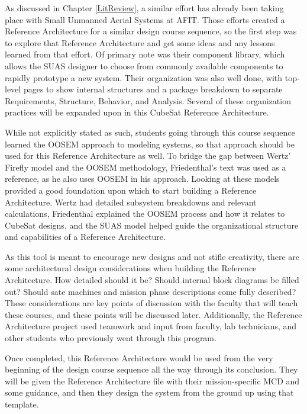 As discussed in Chapter \ref{LitReview}, a similar effort has already been taking place with Small Unmanned Aerial Systems at AFIT. Those efforts created a Reference Architecture for a similar design course sequence, so the first step was to explore that Reference Architecture and get some ideas and any lessons learned from that effort. Of primary note was their component library, which allows the SUAS designer to choose from commonly available components to rapidly prototype a new system. Their organization was also well done, with top-level pages to show internal structures and a package breakdown to separate Requirements, Structure, Behavior, and Analysis. Several of these organization practices will be expanded upon in this CubeSat Reference Architecture.

While not explicitly stated as such, students going through this course sequence learned the OOSEM approach to modeling systems, so that approach should be used for this Reference Architecture as well. To bridge the gap between Wertz' Firefly model \citep{Wertz2011SpaceSMAD} and the OOSEM methodology, Friedenthal's text \citep{FriedenthalArchitectingSpacecraft} was used as a reference, as he also uses OOSEM in his approach. Looking at these models provided a good foundation upon which to start building a Reference Architecture. Wertz had detailed subsystem breakdowns and relevant calculations, Friedenthal explained the OOSEM process and how it relates to CubeSat designs, and the SUAS model \citep{Jacques2019} helped guide the organizational structure and capabilities of a Reference Architecture.

As this tool is meant to encourage new designs and not stifle creativity, there are some architectural design considerations when building the Reference Architecture. How detailed should it be? Should internal block diagrams be filled out? Should sate machines and mission phase descriptions come fully described? These considerations are key points of discussion with the faculty that will teach these courses, and these points will be discussed later. Additionally, the Reference Architecture project used teamwork and input from faculty, lab technicians, and other students who previously went through this program.

Once completed, this Reference Architecture would be used from the very beginning of the design course sequence all the way through its conclusion. They will be given the Reference Architecture file with their mission-specific MCD and some guidance, and then they design the system from the ground up using that template. 

